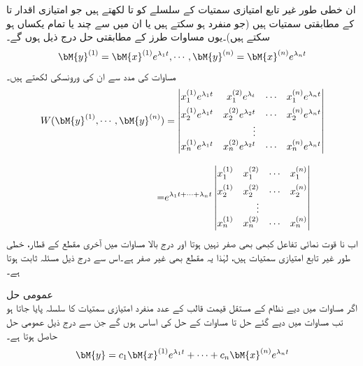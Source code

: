 ان خطی طور غیر تابع امتیازی سمتیات کے سلسلے کو  تا  لکھتے ہیں جو امتیازی اقدار  تا  کے مطابقتی سمتیات ہیں (جو منفرد ہو سکتے ہیں یا ان میں سے چند یا تمام یکساں ہو سکتے ہیں)۔یوں مساوات  طرز کے مطابقتی حل درج ذیل ہوں  گے۔
\begin{align}\label{مساوات_نظام_مستقل_عددی_سر_نظام_ت}
\bM{y}^{(1)}=\bM{x}^{(1)}e^{\lambda_1 t}, \cdots, \bM{y}^{(n)}=\bM{x}^{(n)}e^{\lambda_n t}
\end{align}
مساوات  کی مدد سے ان کی ورونسکی  لکھتے ہیں۔
\begin{gather}\label{مساوات_نظام_مستقل_عددی_سر_نظام_ٹ}
\begin{aligned}
W(\bM{y}^{(1)},\cdots,\bM{y}^{(n)})&=
\begin{vmatrix*}[r]
x_1^{(1)} e^{\lambda_1 t}& x_1^{(2)} e^{\lambda_ t} &\cdots&x_1^{(n)} e^{\lambda_n t}\\[1ex]
x_2^{(1)} e^{\lambda_1 t}& x_2^{(2)} e^{\lambda_2 t} &\cdots&x_2^{(n)} e^{\lambda_n t}\\
& \vdots & &\\
x_n^{(1)} e^{\lambda_1 t}& x_n^{(2)}  e^{\lambda_2 t}&\cdots&x_n^{(n)} e^{\lambda_n t}
\end{vmatrix*}\\[2ex]
=&e^{\lambda_1t+ \cdots+\lambda_n t}
\begin{vmatrix*}[r]
x_1^{(1)}& x_1^{(2)} &\cdots&x_1^{(n)} \\[1ex]
x_2^{(1)} & x_2^{(2)}  &\cdots&x_2^{(n)} \\
& \vdots & &\\
x_n^{(1)} & x_n^{(2)} &\cdots&x_n^{(n)} 
\end{vmatrix*}
\end{aligned}
\end{gather}
اب نا قوت نمائی تفاعل کبھی بھی صفر نہیں ہوتا اور درج بالا مساوات میں آخری مقطع کے قطار، خطی طور غیر تابع امتیازی سمتیات ہیں، لہٰذا یہ مقطع بھی غیر صفر ہے۔اس سے درج ذیل مسئلہ ثابت ہوتا ہے۔

\quad عمومی حل\\
اگر  مساوات  میں دیے نظام کے مستقل قیمت قالب  کے  عدد منفرد امتیازی سمتیات کا سلسلہ پایا جاتا ہو تب مساوات  میں دیے گئے حل  تا  مساوات  کے حل کی اساس ہوں گے جن سے درج ذیل عمومی حل حاصل ہوتا ہے۔
\begin{align}
\bM{y}=c_1\bM{x}^{(1)}e^{\lambda_1 t}+\cdots+c_n\bM{x}^{(n)}e^{\lambda_n t}
\end{align} 

